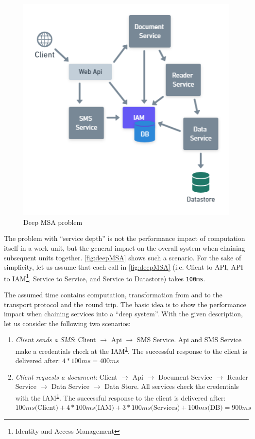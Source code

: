 \begin{figure}[ht]
    \centering
    \includegraphics[width=\columnwidth]{images/service_depth.png}
    \caption{Deep MSA problem}
    \label{fig:deepMSA}
\end{figure}

The problem with ``service depth'' is not the performance
impact of computation itself in a work unit, but the general impact
on the overall system when chaining subsequent units together.
\autoref{fig:deepMSA} shows such a scenario. For the sake of
simplicity, let us assume that each call in \autoref{fig:deepMSA}
(i.e. Client to API, API to IAM\footnote{\label{fn:IAM}Identity and Access Management},
Service to Service, and Service to Datastore) takes \texttt{100ms}.

The assumed time contains computation, transformation from and to
the transport protocol and the round trip.
The basic idea is to show the performance impact when chaining services
into a ``deep system''.
With the given description, let us consider the following two scenarios:

\begin{enumerate}
    \item \textit{Client sends a SMS}:
    Client $\rightarrow$ Api $\rightarrow$ SMS Service. Api and SMS Service make
    a credentials check at the IAM\textsuperscript{\ref{fn:IAM}}.
    The successful response to the client
    is delivered after: $4 * 100ms = 400ms$
    \item \textit{Client requests a document}:
    Client $\rightarrow$ Api $\rightarrow$ Document Service $\rightarrow$
    Reader Service $\rightarrow$ Data Service $\rightarrow$ Data Store.
    All services check the credentials with the IAM\textsuperscript{\ref{fn:IAM}}.
    The successful response to the client
    is delivered after: $100ms \text{(Client)} + 4*100ms \text{(IAM)}
    + 3*100ms \text{(Services)} + 100ms \text{(DB)} = 900ms$
\end{enumerate}

